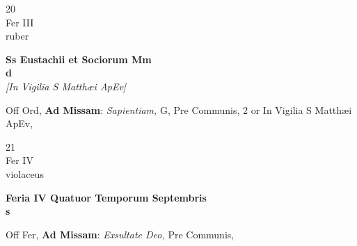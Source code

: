 \documentclass[10pt, openany]{book}
\begin{document}
        \begin{center}
            \begin{minipage}{3.5in}
                \vspace{2em}
                \begin{minipage}{0.5in}
                    {\Huge 20} \\
                    {\normalsize Fer III} \\
                    {\normalsize ruber}
                \end{minipage}
                \begin{minipage}{3.0in}
                    \textbf{ \large Ss Eustachii et Sociorum Mm \\
                    \textnormal{\normalsize d}} \\ \textit{[In Vigilia S Matthæi ApEv]} \\ 
                \end{minipage}
                \begin{justify}Off Ord, \textbf{Ad Missam}: \textit{Sapientiam,} G, Pre Communis, 2 or In Vigilia S Matthæi ApEv,  
                \end{justify}
            \end{minipage}
        \end{center}
    
        \begin{center}
            \begin{minipage}{3.5in}
                \vspace{2em}
                \begin{minipage}{0.5in}
                    {\Huge 21} \\
                    {\normalsize Fer IV} \\
                    {\normalsize violaceus}
                \end{minipage}
                \begin{minipage}{3.0in}
                    \textbf{ \large Feria IV Quatuor Temporum Septembris \\
                    \textnormal{\normalsize s}} \\ 
                \end{minipage}
                \begin{justify}Off Fer, \textbf{Ad Missam}: \textit{Exsultate Deo,} Pre Communis,  
                \end{justify}
            \end{minipage}
        \end{center}
    
\end{document}
